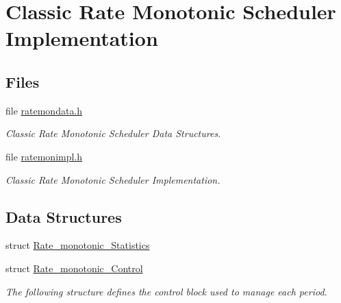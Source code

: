 \hypertarget{group__ClassicRateMonImpl}{}\section{Classic Rate Monotonic Scheduler Implementation}
\label{group__ClassicRateMonImpl}
\subsection*{Files}
\begin{DoxyCompactItemize}
\item 
file \mbox{\hyperlink{ratemondata_8h}{ratemondata.\+h}}
\begin{DoxyCompactList}\small\item\em Classic Rate Monotonic Scheduler Data Structures. \end{DoxyCompactList}\item 
file \mbox{\hyperlink{ratemonimpl_8h}{ratemonimpl.\+h}}
\begin{DoxyCompactList}\small\item\em Classic Rate Monotonic Scheduler Implementation. \end{DoxyCompactList}\end{DoxyCompactItemize}
\subsection*{Data Structures}
\begin{DoxyCompactItemize}
\item 
struct \mbox{\hyperlink{structRate__monotonic__Statistics}{Rate\+\_\+monotonic\+\_\+\+Statistics}}
\item 
struct \mbox{\hyperlink{structRate__monotonic__Control}{Rate\+\_\+monotonic\+\_\+\+Control}}
\begin{DoxyCompactList}\small\item\em The following structure defines the control block used to manage each period. \end{DoxyCompactList}\end{DoxyCompactItemize}
